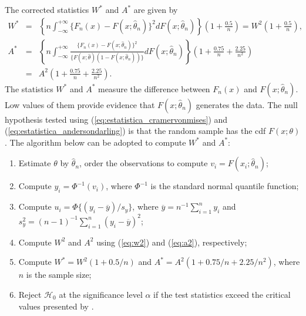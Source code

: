 \documentclass[10pt,letterpaper]{article}
\begin{document}
The corrected statistics $W^*$ and $A^*$ are given by
\begin{eqnarray}
W^*
&=&
\left\{n \int_{-\infty}^{+\infty} \{F_n(x) - F(x;\widehat \theta_n)\}^2 dF(x;\widehat \theta_n)\right\}\left(1+\frac{0.5}{n}\right) = W^2\left(1+\frac{0.5}{n}\right),
\label{eq:estatistica_cramervonmises}
\\
A^*
&=&
\left\{n \int_{-\infty}^{+\infty} \frac{ \{F_n(x) - F(x;\widehat \theta_n) \}^2 }{ \{F(x;\widehat \theta)(1-F(x;\widehat \theta_n))\} }dF(x;\widehat \theta_n)\right\}\left(1 + \frac{0.75}{n} + \frac{2.25}{n^2}\right)
\nonumber
\\
&=&
A^2 \left(1 + \frac{0.75}{n} + \frac{2.25}{n^2}\right).
\label{eq:estatistica_andersondarling}
\end{eqnarray}
The statistics $W^*$ and $A^*$  measure  the difference between $F_n(x)$ and $F(x;\widehat\theta_n)$.
Low values of them provide  evidence that $F(x;\widehat \theta_n)$ generates the data.
The null hypothesis tested using (\ref{eq:estatistica_cramervonmises}) and (\ref{eq:estatistica_andersondarling})
is that the random sample has the cdf $F(x;\theta)$.
The algorithm below can be adopted to compute $W^*$ and $A^*$:
\begin{enumerate}

\item
Estimate $\theta$ by $\widehat \theta_n$, order the observations to compute $v_i = F(x_i;\widehat \theta_n)$;

\item
Compute $y_i = \Phi^{-1}(v_i)$, where $\Phi^{-1}$ is the standard normal quantile function;

\item
Compute $u_i = \Phi\{(y_i-\overline{y})/s_y \}$, where $\overline{y} = n^{-1}\sum_{i=1}^{n}y_i$ and $s_y^2 = (n-1)^{-1}\sum_{i=1}^{n}(y_i-\overline{y})^2$;

\item
Compute $W^2$ and $A^2$ using (\ref{eq:w2}) and (\ref{eq:a2}), respectively;

\item
Compute $W^* = W^2(1+0.5/n)$ and $A^* = A^2(1+0.75/n+2.25/n^2)$, where $n$ is the sample size;

\item
Reject $\mathcal{H}_0$ at the significance level $\alpha$ if the test statistics exceed the critical values presented by \cite{chen1995general}.

\end{enumerate}
\end{document}

